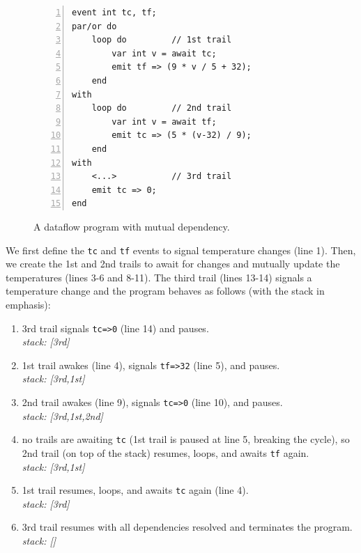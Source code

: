 \documentclass{acm_proc_article-sp}
\newcommand{\code}[1] {{\small{\texttt{#1}}}}
\newcommand{\1}{\;}
\newcommand{\2}{\;\;}
\newcommand{\3}{\;\;\;}
\newcommand{\5}{\;\;\;\;\;}
\begin{document}
\begin{figure}[t]
\begin{minipage}[t]{0.22\linewidth}
\hspace{0.0cm}
\end{minipage}
%
\begin{minipage}[t]{0.10\linewidth}
\hspace{0.4cm}
\end{minipage}
\begin{minipage}[t]{0.67\linewidth}
\begin{lstlisting}[numbers=left,xleftmargin=1em]
event int tc, tf;
par/or do
    loop do         // 1st trail
        var int v = await tc;
        emit tf => (9 * v / 5 + 32);
    end
with
    loop do         // 2nd trail
        var int v = await tf;
        emit tc => (5 * (v-32) / 9);
    end
with
    <...>           // 3rd trail
    emit tc => 0;
end
\end{lstlisting}
\end{minipage}
\caption{ A dataflow program with mutual dependency.
\label{lst.frp2}
}
\end{figure}
%
We first define the \code{tc} and \code{tf} events to signal temperature 
changes (line 1).
Then, we create the 1st and 2nd trails to await for changes and mutually update 
the temperatures (lines 3-6 and 8-11).
The third trail (lines 13-14) signals a temperature change and the program 
behaves as follows (with the stack in emphasis):
%
{\small
\begin{enumerate}
\setlength{\itemsep}{0pt}
\item 3rd trail signals \code{tc=>0} (line 14) and pauses.\\
    \emph{stack: [3rd]}
\item 1st trail awakes (line 4), signals \code{tf=>32} (line 5), and pauses.\\
    \emph{stack: [3rd,1st]}
\item 2nd trail awakes (line 9), signals \code{tc=>0} (line 10), and pauses.\\
    \emph{stack: [3rd,1st,2nd]}
\item no trails are awaiting \code{tc} (1st trail is paused at line 5, breaking 
    the cycle), so 2nd trail (on top of the stack) resumes, loops, and awaits 
\code{tf} again.\\
    \emph{stack: [3rd,1st]}
\item 1st trail resumes, loops, and awaits \code{tc} again (line 4).\\
    \emph{stack: [3rd]}
\item 3rd trail resumes with all dependencies resolved and terminates the 
    program.\\
    \emph{stack: []}
\end{enumerate}
}
\end{document}
